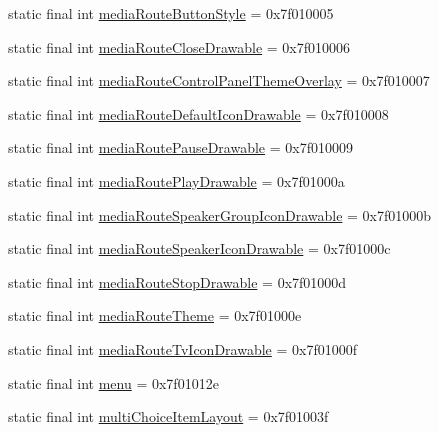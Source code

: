 \begin{CompactItemize}
\item 
static final int \hyperlink{classandroid_1_1support_1_1v7_1_1recyclerview_1_1_r_1_1attr_df3f35775a96f8daa76217bba2490da4}{mediaRouteButtonStyle} = 0x7f010005
\item 
static final int \hyperlink{classandroid_1_1support_1_1v7_1_1recyclerview_1_1_r_1_1attr_14c94a85d9cf0fae57d8997fb109fd8c}{mediaRouteCloseDrawable} = 0x7f010006
\item 
static final int \hyperlink{classandroid_1_1support_1_1v7_1_1recyclerview_1_1_r_1_1attr_3626ffbedd7ef5a8436826ccac0b8109}{mediaRouteControlPanelThemeOverlay} = 0x7f010007
\item 
static final int \hyperlink{classandroid_1_1support_1_1v7_1_1recyclerview_1_1_r_1_1attr_b6b52f7a7de2fedfdace4f288ca179a8}{mediaRouteDefaultIconDrawable} = 0x7f010008
\item 
static final int \hyperlink{classandroid_1_1support_1_1v7_1_1recyclerview_1_1_r_1_1attr_cf3900a35ec057c26c29f798fd22aaf3}{mediaRoutePauseDrawable} = 0x7f010009
\item 
static final int \hyperlink{classandroid_1_1support_1_1v7_1_1recyclerview_1_1_r_1_1attr_8b8407b05a1ed86fa52957028ca6aa01}{mediaRoutePlayDrawable} = 0x7f01000a
\item 
static final int \hyperlink{classandroid_1_1support_1_1v7_1_1recyclerview_1_1_r_1_1attr_52be73ddd9304c8257f8505d5bb9a2d8}{mediaRouteSpeakerGroupIconDrawable} = 0x7f01000b
\item 
static final int \hyperlink{classandroid_1_1support_1_1v7_1_1recyclerview_1_1_r_1_1attr_b33ca51763c14724f08f5931f0ddfc86}{mediaRouteSpeakerIconDrawable} = 0x7f01000c
\item 
static final int \hyperlink{classandroid_1_1support_1_1v7_1_1recyclerview_1_1_r_1_1attr_12855dc9e5bca1aa3cdfa21012c27acc}{mediaRouteStopDrawable} = 0x7f01000d
\item 
static final int \hyperlink{classandroid_1_1support_1_1v7_1_1recyclerview_1_1_r_1_1attr_e516f2a0b7a437e77a4d8f51ffbb2af5}{mediaRouteTheme} = 0x7f01000e
\item 
static final int \hyperlink{classandroid_1_1support_1_1v7_1_1recyclerview_1_1_r_1_1attr_1cfc83d533686117f36192ee0fdb3a25}{mediaRouteTvIconDrawable} = 0x7f01000f
\item 
static final int \hyperlink{classandroid_1_1support_1_1v7_1_1recyclerview_1_1_r_1_1attr_f222020730d333b98883ffc57b4a77bb}{menu} = 0x7f01012e
\item 
static final int \hyperlink{classandroid_1_1support_1_1v7_1_1recyclerview_1_1_r_1_1attr_512ccde6eaef8ff04f623eb0e1a963e5}{multiChoiceItemLayout} = 0x7f01003f

\end{CompactItemize}
